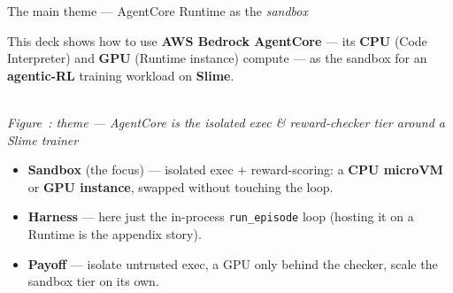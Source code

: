 \documentclass[aspectratio=169]{beamer}
\newcounter{deckfig}
\newcommand{\figtag}[1]{\refstepcounter{deckfig}%
  {\scriptsize\itshape Figure~\thedeckfig: #1}}
\begin{document}
\begin{frame}{The main theme --- AgentCore Runtime as the \emph{sandbox}}
  \begin{center}
  {\large This deck shows how to use \textbf{AWS Bedrock AgentCore} --- its \textbf{CPU}
  (Code Interpreter) and \textbf{GPU} (Runtime instance) compute --- as the \alert{sandbox}
  for an \textbf{agentic-RL} training workload on \textbf{Slime}.}
  \end{center}
  \begin{center}
  \\[0.15em]\figtag{theme --- AgentCore is the isolated exec \& reward-checker tier around a Slime trainer}
  \end{center}
  \vspace{-0.1em}
  \footnotesize
  \begin{itemize}\setlength\itemsep{0.03em}
    \item \textbf{Sandbox} (the focus) --- isolated exec $+$ reward-scoring: a \textbf{CPU microVM} or \textbf{GPU instance}, swapped without touching the loop.
    \item \textbf{Harness} --- here just the in-process \texttt{run\_episode} loop (hosting it on a Runtime is the appendix story).
    \item \textbf{Payoff} --- isolate untrusted exec, a GPU only behind the checker, scale the sandbox tier on its own.
  \end{itemize}
\end{frame}
\end{document}
